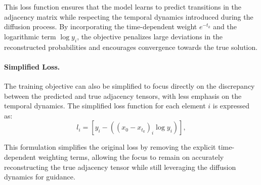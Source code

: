 This loss function ensures that the model learns to predict transitions in the adjacency matrix while respecting the temporal dynamics introduced during the diffusion process. By incorporating the time-dependent weight \(e^{-t_k}\) and the logarithmic term \(\log y_i\), the objective penalizes large deviations in the reconstructed probabilities and encourages convergence towards the true solution.

\paragraph{Simplified Loss.}  
The training objective can also be simplified to focus directly on the discrepancy between the predicted and true adjacency tensors, with less emphasis on the temporal dynamics. The simplified loss function for each element \(i\) is expressed as:
\begin{equation}
l_i = \left[ y_i - \left( (x_0 - x_{t_k})_i \log y_i \right) \right],
\label{eq:Simplified_Loss}
\end{equation}

This formulation simplifies the original loss by removing the explicit time-dependent weighting terms, allowing the focus to remain on accurately reconstructing the true adjacency tensor while still leveraging the diffusion dynamics for guidance.
